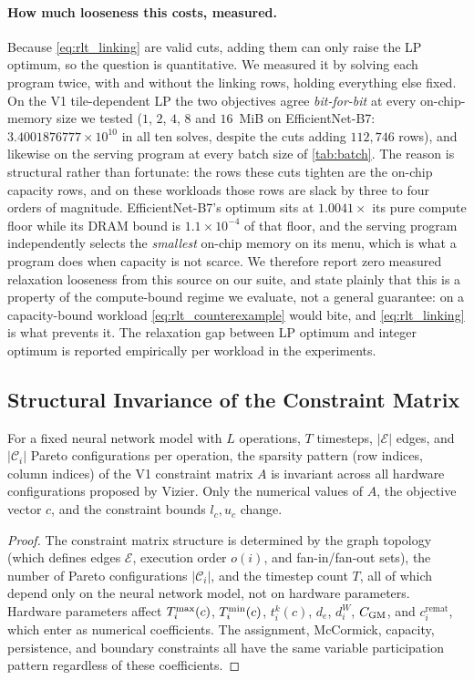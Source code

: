 \paragraph{How much looseness this costs, measured.}
Because \cref{eq:rlt_linking} are valid cuts, adding them can only raise the LP
optimum, so the question is quantitative. We measured it by solving each program
twice, with and without the linking rows, holding everything else fixed. On the
V1 tile-dependent LP the two objectives agree \emph{bit-for-bit} at every
on-chip-memory size we tested ($1$, $2$, $4$, $8$ and $16$~MiB on
EfficientNet-B7: $3.4001876777\times10^{10}$ in all ten solves, despite the cuts
adding $112{,}746$ rows), and likewise on the serving program at every batch
size of \cref{tab:batch}. The reason is structural rather than fortunate: the
rows these cuts tighten are the on-chip capacity rows, and on these workloads
those rows are slack by three to four orders of magnitude. EfficientNet-B7's
optimum sits at $1.0041\times$ its pure compute floor while its DRAM bound is
$1.1\times10^{-4}$ of that floor, and the serving program independently selects
the \emph{smallest} on-chip memory on its menu, which is what a program does
when capacity is not scarce. We therefore report zero measured relaxation
looseness from this source on our suite, and state plainly that this is a
property of the compute-bound regime we evaluate, not a general guarantee: on a
capacity-bound workload \cref{eq:rlt_counterexample} would bite, and
\cref{eq:rlt_linking} is what prevents it. The relaxation gap between LP optimum
and integer optimum is reported empirically per workload in the experiments.

\subsection{Structural Invariance of the Constraint Matrix}
\label{app:invar}

\begin{proposition}
\label{prop:invariance}
For a fixed neural network model with $L$ operations, $T$ timesteps, $|\mathcal{E}|$ edges, and $|\mathcal{C}_i|$ Pareto configurations per operation, the sparsity pattern (row indices, column indices) of the V1 constraint matrix $A$ is invariant across all hardware configurations proposed by Vizier. Only the numerical values of $A$, the objective vector $c$, and the constraint bounds $l_c, u_c$ change.
\end{proposition}

\begin{proof}
The constraint matrix structure is determined by the graph topology (which defines edges $\mathcal{E}$, execution order $o(i)$, and fan-in/fan-out sets), the number of Pareto configurations $|\mathcal{C}_i|$, and the timestep count $T$, all of which depend only on the neural network model, not on hardware parameters. Hardware parameters affect $T^{\max}_i(c)$, $T^{\min}_i(c)$, $t_i^k(c)$, $d_e$, $d_i^W$, $C_{\text{GM}}$, and $c_i^{\text{remat}}$, which enter as numerical coefficients. The assignment, McCormick, capacity, persistence, and boundary constraints all have the same variable participation pattern regardless of these coefficients.
\end{proof}

